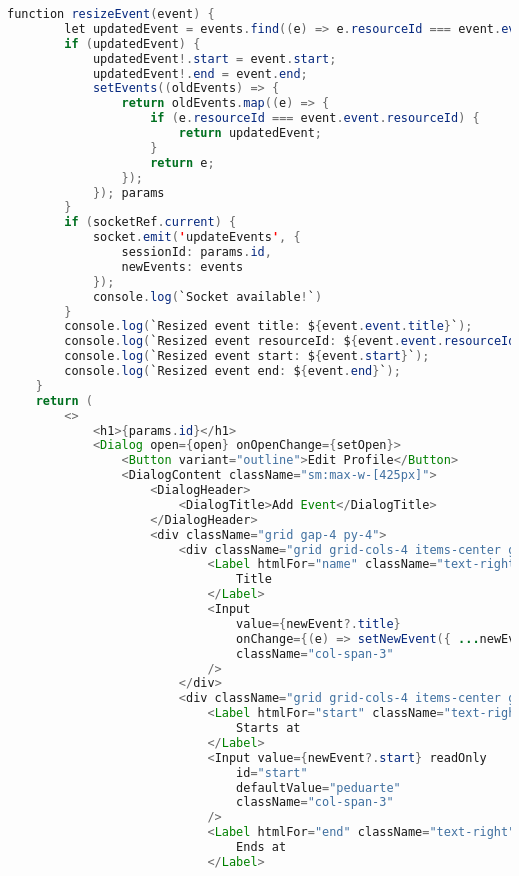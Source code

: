 \begin{lstlisting}[language=Java, caption={Calendar Page}, label={lst:java}]
    function resizeEvent(event) {
        let updatedEvent = events.find((e) => e.resourceId === event.event.resourceId);
        if (updatedEvent) {
            updatedEvent!.start = event.start;
            updatedEvent!.end = event.end;
            setEvents((oldEvents) => {
                return oldEvents.map((e) => {
                    if (e.resourceId === event.event.resourceId) {
                        return updatedEvent;
                    }
                    return e;
                });
            }); params
        }
        if (socketRef.current) {
            socket.emit('updateEvents', {
                sessionId: params.id,
                newEvents: events
            });
            console.log(`Socket available!`)
        }
        console.log(`Resized event title: ${event.event.title}`);
        console.log(`Resized event resourceId: ${event.event.resourceId}`);
        console.log(`Resized event start: ${event.start}`);
        console.log(`Resized event end: ${event.end}`);
    }
    return (
        <>
            <h1>{params.id}</h1>
            <Dialog open={open} onOpenChange={setOpen}>
                <Button variant="outline">Edit Profile</Button>
                <DialogContent className="sm:max-w-[425px]">
                    <DialogHeader>
                        <DialogTitle>Add Event</DialogTitle>
                    </DialogHeader>
                    <div className="grid gap-4 py-4">
                        <div className="grid grid-cols-4 items-center gap-4">
                            <Label htmlFor="name" className="text-right">
                                Title
                            </Label>
                            <Input
                                value={newEvent?.title}
                                onChange={(e) => setNewEvent({ ...newEvent, title: e.target.value })}
                                className="col-span-3"
                            />
                        </div>
                        <div className="grid grid-cols-4 items-center gap-4">
                            <Label htmlFor="start" className="text-right">
                                Starts at
                            </Label>
                            <Input value={newEvent?.start} readOnly
                                id="start"
                                defaultValue="peduarte"
                                className="col-span-3"
                            />
                            <Label htmlFor="end" className="text-right">
                                Ends at
                            </Label>

\end{lstlisting}
